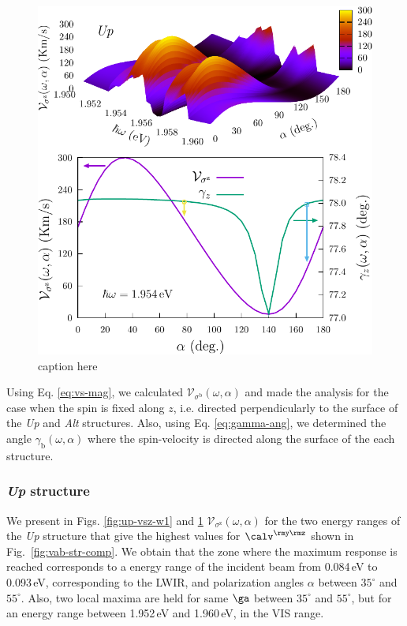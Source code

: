 \documentclass[prb,11pt,tightenlines,twocolumn,aps]{revtex4-1}
\begin{document}
\begin{figure}[t]
    \centering
    \includegraphics[width=\linewidth]{upplots/up-vsz-w2}
    \caption{caption here}
    \label{fig:up-vsz-w2}
\end{figure}


Using Eq. \eqref{eq:vs-mag}, we calculated $\mathcal{V}_{\sigma^{\mathrm{b}}}
(\omega,\alpha)$ and made the analysis for the case when the spin is fixed
along $z$, i.e. directed perpendicularly to the surface of the \emph{Up} and
\emph{Alt} structures. Also, using Eq. \eqref{eq:gamma-ang}, we determined the
angle $\gamma_{\mathrm{b}}(\omega,\alpha)$ where the spin-velocity is directed
along the surface of the each structure.
% 

\subsubsection{\emph{Up} structure}\label{up:fs}

We present in Figs. \ref{fig:up-vsz-w1} and \ref{fig:up-vsz-w2}
$\mathcal{V}_{\sigma^{\mathrm{z}}} (\omega,\alpha)$ for the two energy ranges
of the \emph{Up} structure that give the highest values for $\calv^{\rmy\rmz}$
shown in Fig.~\ref{fig:vab-str-comp}.
% 
We obtain that the zone where the maximum response is reached corresponds to a
energy range of the incident beam from 0.084\,eV to 0.093\,eV, corresponding to
the LWIR, and polarization angles $\alpha$ between $35^{\circ}$ and
$55^{\circ}$. Also,  two local maxima are held for same $\ga$ between
$35^{\circ}$ and $55^{\circ}$, but for an energy range between 1.952\,eV and
1.960\,eV, in the VIS range.
\end{document}
